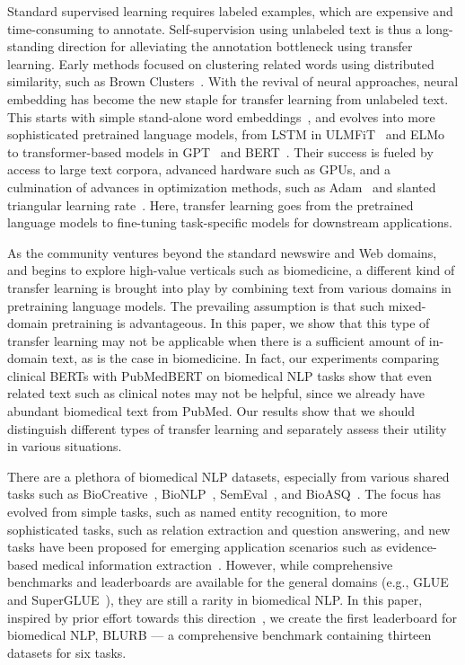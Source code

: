 \documentclass[acmlarge,screen,nonacm]{acmart}
\begin{document}
Standard supervised learning requires labeled examples, which are expensive and time-consuming to annotate. Self-supervision using unlabeled text is thus a long-standing direction for alleviating the annotation bottleneck using transfer learning. Early methods focused on clustering related words using distributed similarity, such as Brown Clusters~\cite{brown1992class,liang2005semi}. With the revival of neural approaches, neural embedding has become the new staple for transfer learning from unlabeled text. This starts with simple stand-alone word embeddings~\cite{mikolov2013efficient,pennington2014glove}, and evolves into more sophisticated pretrained language models, from LSTM in ULMFiT~\cite{howard2018ulm-ft} and ELMo~\cite{peters2018elmo} to transformer-based models in GPT~\cite{radford2018improving,radford2019language} and BERT~\cite{devlin2018bert,liu2019roberta}. Their success is fueled by access to large text corpora, advanced hardware such as GPUs, and a culmination of advances in optimization methods, such as Adam~\cite{kingma2014adam} and slanted triangular learning rate~\cite{howard2018ulm-ft}.
Here, transfer learning goes from the pretrained language models to fine-tuning task-specific models for downstream applications. 

As the community ventures beyond the standard newswire and Web domains, and begins to explore high-value verticals such as biomedicine, a different kind of transfer learning is brought into play by combining text from various domains in pretraining language models. The prevailing assumption is that such mixed-domain pretraining is advantageous. In this paper, we show that this type of transfer learning may not be applicable when there is a sufficient amount of in-domain text, as is the case in biomedicine. In fact, our experiments comparing clinical BERTs with PubMedBERT on biomedical NLP tasks show that even related text such as clinical notes may not be helpful, since we already have abundant biomedical text from PubMed. Our results show that we should distinguish different types of transfer learning and separately assess their utility in various situations.

There are a plethora of biomedical NLP datasets, especially from various shared tasks such as BioCreative~\cite{smith2008overview,Arighi2011,Mao2014OverviewOT,Kim2015OverviewOB}, BioNLP~\cite{10.5555/2107691.2107693,DBLP:conf/bionlp/2019}, SemEval~\cite{DBLP:conf/semeval/2018,DBLP:conf/semeval/2017,DBLP:conf/semeval/2016,DBLP:conf/semeval/2013}, and BioASQ~\cite{nentidis2019results}. 
The focus has evolved from simple tasks, such as named entity recognition, to more sophisticated tasks, such as relation extraction and question answering, and new tasks have been proposed for emerging application scenarios such as evidence-based medical information extraction~\cite{nye2018corpus}. 
However, while comprehensive benchmarks and leaderboards are available for the general domains (e.g., GLUE~\cite{wang19iclr_glue} and SuperGLUE~\cite{wang2019superglue}), they are still a rarity in biomedical NLP. In this paper, inspired by prior effort towards this direction~\cite{peng2019transfer}, we create the first leaderboard for biomedical NLP, BLURB --- a comprehensive benchmark containing thirteen datasets for six tasks. 
\end{document}
